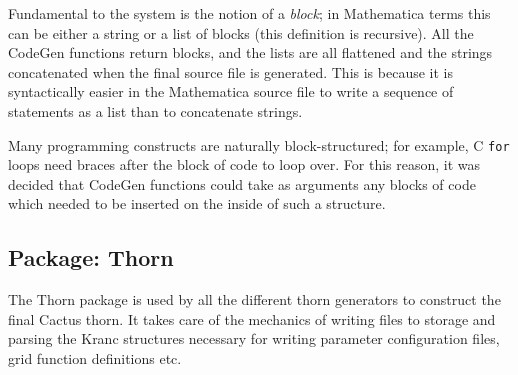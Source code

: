\documentclass{report}
\begin{document}
Fundamental to the system is the notion of a {\em block}; in
Mathematica terms this can be either a string or a list of blocks
(this definition is recursive).  All the CodeGen functions return
blocks, and the lists are all flattened and the strings concatenated
when the final source file is generated.  This is because it is
syntactically easier in the Mathematica source file to write a
sequence of statements as a list than to concatenate strings.

Many programming constructs are naturally block-structured; for
example, C {\tt for} loops need braces after the block of code to loop
over.  For this reason, it was decided that CodeGen functions could
take as arguments any blocks of code which needed to be inserted on
the inside of such a structure.

\subsection{Package: Thorn}

The Thorn package is used by all the different thorn generators to
construct the final Cactus thorn. It takes care of the mechanics of
writing files to storage and parsing the Kranc structures necessary
for writing parameter configuration files, grid function definitions
etc.
\end{document}
